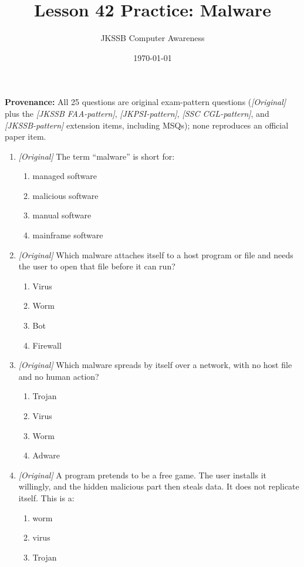 \documentclass[11pt]{article}
\title{Lesson 42 Practice: Malware}
\author{JKSSB Computer Awareness}
\date{\today}
\begin{document}
\maketitle
\noindent\textbf{Provenance:} All 25 questions are original exam-pattern questions (\textit{[Original]} plus the \textit{[JKSSB FAA-pattern]}, \textit{[JKPSI-pattern]}, \textit{[SSC CGL-pattern]}, and \textit{[JKSSB-pattern]} extension items, including MSQs); none reproduces an official paper item.

\begin{enumerate}[label=\textbf{Q\arabic*.}, leftmargin=*]
\item \textit{[Original]} The term ``malware'' is short for:
  \begin{enumerate}[label=\Alph*.]
    \item managed software
    \item malicious software
    \item manual software
    \item mainframe software
  \end{enumerate}
\item \textit{[Original]} Which malware attaches itself to a host program or
  file and needs the user to open that file before it can run?
  \begin{enumerate}[label=\Alph*.]
    \item Virus
    \item Worm
    \item Bot
    \item Firewall
  \end{enumerate}
\item \textit{[Original]} Which malware spreads by itself over a network,
  with no host file and no human action?
  \begin{enumerate}[label=\Alph*.]
    \item Trojan
    \item Virus
    \item Worm
    \item Adware
  \end{enumerate}
\item \textit{[Original]} A program pretends to be a free game. The user
  installs it willingly, and the hidden malicious part then steals data. It
  does not replicate itself. This is a:
  \begin{enumerate}[label=\Alph*.]
    \item worm
    \item virus
    \item Trojan

\end{enumerate}
\end{enumerate}
\end{document}
